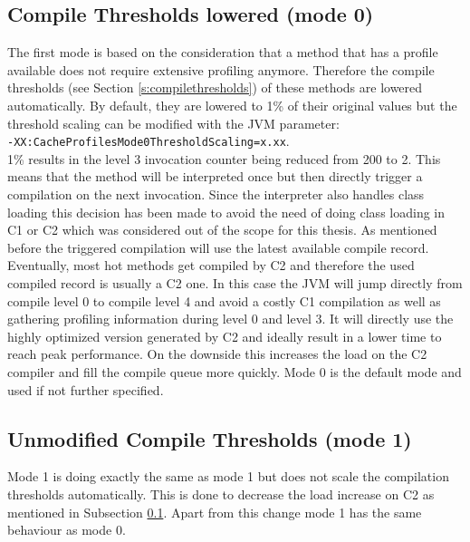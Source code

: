 \subsection{Compile Thresholds lowered (mode 0)}
\label{s:mode0}
The first mode is based on the consideration that a method that has a profile available does not require extensive profiling anymore. Therefore the compile thresholds (see Section \ref{s:compilethresholds}) of these methods are lowered automatically. By default, they are lowered to 1\% of their original values but the threshold scaling can be modified with the JVM parameter: \\\texttt{-XX:CacheProfilesMode0ThresholdScaling=x.xx}. 
\\1\% results in the level 3 invocation counter being reduced from 200 to 2. This means that the method will be interpreted once but then directly trigger a compilation on the next invocation.
Since the interpreter also handles class loading this decision has been made to avoid the need of doing class loading in C1 or C2 which was considered out of the scope for this thesis.
As mentioned before the triggered compilation will use the latest available compile record. Eventually, most hot methods get compiled by C2 and therefore the used compiled record is usually a C2 one. In this case the JVM will jump directly from compile level 0 to compile level 4 and avoid a costly C1 compilation as well as gathering profiling information during level 0 and level 3.
It will directly use the highly optimized version generated by C2 and ideally result in a lower time to reach peak performance.
On the downside this increases the load on the C2 compiler and fill the compile queue more quickly.
Mode 0 is the default mode and used if not further specified.
\subsection{Unmodified Compile Thresholds (mode 1)}
\label{s:mode1}
Mode 1 is doing exactly the same as mode 1 but does not scale the compilation thresholds automatically.
This is done to decrease the load increase on C2 as mentioned in Subsection \ref{s:mode0}.
Apart from this change mode 1 has the same behaviour as mode 0.
